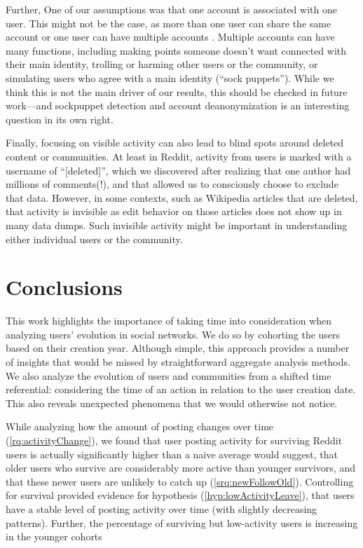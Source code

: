 Further, One of our assumptions was that one account is associated with one user. This might not be the case, as more than one user can share the same account \cite{Lampinen2014} or one user can have multiple accounts \cite{Bergstrom2011}.  Multiple accounts can have many functions, including making points someone doesn't want connected with their main identity, trolling or harming other users or the community, or simulating users who agree with a main identity (``sock puppets'').  While we think this is not the main driver of our results, this should be checked in future work---and sockpuppet detection and account deanonymization is an interesting question in its own right.

Finally, focusing on visible activity can also lead to blind spots around deleted content or communities.  At least in Reddit, activity from users is marked with a username of ``[deleted]'', which we discovered after realizing that one author had millions of comments(!), and that allowed us to consciously choose to exclude that data.  However, in some contexts, such as Wikipedia articles that are deleted, that activity is invisible as edit behavior on those articles does not show up in many data dumps.  Such invisible activity might be important in understanding either individual users or the community. 

\section{Conclusions}

This work highlights the importance of taking time into consideration when analyzing users' evolution in social networks. We do so by cohorting the users based on their creation year. Although simple, this approach provides a number of insights that would be missed by straightforward aggregate analysis methods.  We also analyze the evolution of users and communities from a shifted time referential: considering the time of an action in relation to the user creation date. This also reveals unexpected phenomena that we would otherwise not notice.

While analyzing how the amount of posting changes over time (\ref{rq:activityChange}), we found that user posting activity for surviving Reddit users is actually significantly higher than a naive average would suggest, that older users who survive are considerably more active than younger survivors, and that these newer users are unlikely to catch up (\ref{srq:newFollowOld}).  Controlling for survival provided evidence for hypothesis (\ref{hyp:lowActivityLeave}), that users have a stable level of posting activity over time (with slightly decreasing patterns).  Further, the percentage of surviving but low-activity users is increasing in the younger cohorts 

